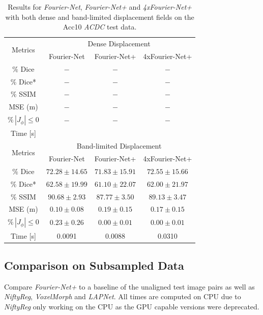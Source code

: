 \documentclass[english,version-2022-01]{uzl-thesis} %
\begin{document}
\begin{table}[h] %
	\centering
	\caption{Results for \emph{Fourier-Net}, \emph{Fourier-Net+} and \emph{4xFourier-Net+} with both dense and band-limited displacement fields on the Acc10 \emph{ACDC} test data.}
	\label{tab:DenseDisplacementAcc10}
	\begin{tabular}{c c c c} %
		\toprule
		\multirow{2}{*}{Metrics} & \multicolumn{3}{c}{Dense Displacement} \\
		\cline{2-4} 
		 & Fourier-Net & Fourier-Net+ & 4xFourier-Net+\\	
		\midrule
		$\%$ Dice & $-$ & $-$ & $-$\\
		$\%$ Dice* & $-$ & $-$ & $-$ \\
		$\%$ SSIM & $-$ & $-$ & $-$\\
		MSE (m) & $-$ & $-$ & $-$ \\
		$\% \, |J_{\phi}|\leq0$ & $-$ & $-$ & $-$ \\
		Time [s] 	  &   	&  	&   \\
		\midrule
		\multirow{2}{*}{Metrics} & \multicolumn{3}{c}{Band-limited Displacement} \\
		\cline{2-4} 
		 & Fourier-Net & Fourier-Net+ & 4xFourier-Net+\\		
		\midrule
		$\%$ Dice & $72.28 \pm 14.65$ & $71.83 \pm 15.91$ & $72.55 \pm 15.66$\\
		$\%$ Dice* & $62.58 \pm 19.99$ & $61.10 \pm 22.07$ & $62.00 \pm 21.97$ \\
		$\%$ SSIM & $90.68 \pm 2.93$ & $87.77 \pm 3.50$ & $89.13 \pm 3.47$\\
		MSE (m) & $0.10 \pm 0.08$ & $0.19 \pm 0.15$ & $0.17 \pm 0.15$ \\
		$\% \, |J_{\phi}|\leq0$ & $0.23 \pm 0.26$ & $0.00 \pm 0.01$ & $0.00 \pm 0.01$ \\
		Time [s] 	  & 0.0091 & 0.0088 & 0.0310\\
		\bottomrule
	\end{tabular}	
\end{table}
 

\subsection{Comparison on Subsampled Data} \label{SubSec:ResultsComparisonSubsampling}
Compare \emph{Fourier-Net+} to a baseline of the unaligned test image pairs as well as \emph{NiftyReg}, \emph{VoxelMorph} and \emph{LAPNet}. All times are computed on CPU due to \emph{NiftyReg} only working on the CPU as the GPU capable versions were deprecated.
\end{document}

